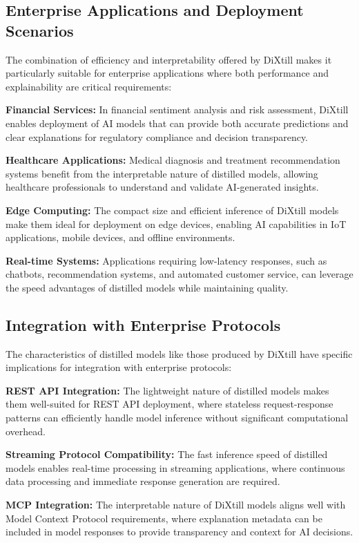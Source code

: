 \subsection{Enterprise Applications and Deployment Scenarios}

The combination of efficiency and interpretability offered by DiXtill makes it particularly suitable for enterprise applications where both performance and explainability are critical requirements:

\textbf{Financial Services:} In financial sentiment analysis and risk assessment, DiXtill enables deployment of AI models that can provide both accurate predictions and clear explanations for regulatory compliance and decision transparency.

\textbf{Healthcare Applications:} Medical diagnosis and treatment recommendation systems benefit from the interpretable nature of distilled models, allowing healthcare professionals to understand and validate AI-generated insights.

\textbf{Edge Computing:} The compact size and efficient inference of DiXtill models make them ideal for deployment on edge devices, enabling AI capabilities in IoT applications, mobile devices, and offline environments.

\textbf{Real-time Systems:} Applications requiring low-latency responses, such as chatbots, recommendation systems, and automated customer service, can leverage the speed advantages of distilled models while maintaining quality.

\subsection{Integration with Enterprise Protocols}

The characteristics of distilled models like those produced by DiXtill have specific implications for integration with enterprise protocols:

\textbf{REST API Integration:} The lightweight nature of distilled models makes them well-suited for REST API deployment, where stateless request-response patterns can efficiently handle model inference without significant computational overhead.

\textbf{Streaming Protocol Compatibility:} The fast inference speed of distilled models enables real-time processing in streaming applications, where continuous data processing and immediate response generation are required.

\textbf{MCP Integration:} The interpretable nature of DiXtill models aligns well with Model Context Protocol requirements, where explanation metadata can be included in model responses to provide transparency and context for AI decisions.

